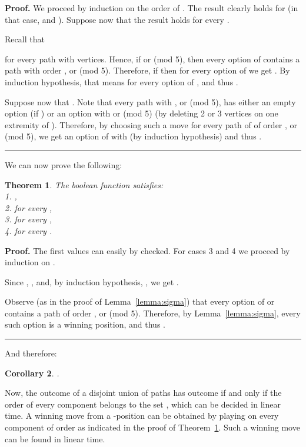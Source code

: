 \documentclass[11pt]{article}
\newtheorem{theorem}{Theorem}
\newtheorem{corollary}[theorem]{Corollary}
\newcommand\qed{\mbox{}\hfill\rule{0.5em}{0.809em}\par\vskip 5mm}
\newenvironment{proof}[0]{\noindent\textbf{Proof.}}{\qed}
\newcommand{\modu}[1]{({\rm mod} #1)}
\begin{document}
\begin{proof}
We proceed by induction on the order  of .
The result clearly holds for  (in that case, 
and ).
Suppose now that the result holds for every .

Recall that

for every path with  vertices. 
Hence, if  or  \modu{5},
then every option of 
contains a path with order ,  or  \modu{5}.
Therefore, if 
then for every option  of  we get
.
By induction hypothesis, that means 
for every option  of , and thus .

Suppose now that .
Note that every path  with ,  or  \modu{5},
has either an empty option (if ) or an option 
with  or  \modu{5} (by deleting 2 or 3 vertices
on one extremity of ). Therefore, by choosing such a move
for every path of  of order ,  or  \modu{5},
we get an option  of  with  (by induction
hypothesis) and thus .
\end{proof} 

We can now prove the following:

\begin{theorem}
The boolean function  satisfies:\\
1. ,\\
2.  for every ,\\
3.  for every ,\\
4.  for every .
\label{th:shortened-selective-misere}
\end{theorem}

\begin{proof}
The first values can easily by checked.
For cases 3 and 4 we proceed by induction on .

Since , ,
 and, by induction hypothesis,
, we get
.

Observe (as in the proof of Lemma~\ref{lemma:sigma}) that
 every option of  or 
contains a path of order ,  or  \modu{5}.
Therefore, by Lemma~\ref{lemma:sigma}, every such option
is a winning position, and thus 
.
\end{proof}

And therefore:

\begin{corollary}
.
\end {corollary}

Now, the outcome of a disjoint union of paths has outcome 
if and only if the order of every component belongs to the set ,
which can be decided in linear time.
A winning move from a -position can be obtained by playing
on every component of order  as indicated in the
proof of Theorem~\ref{th:shortened-selective-misere}.
Such a winning move
can be found in linear time.
\end{document}

